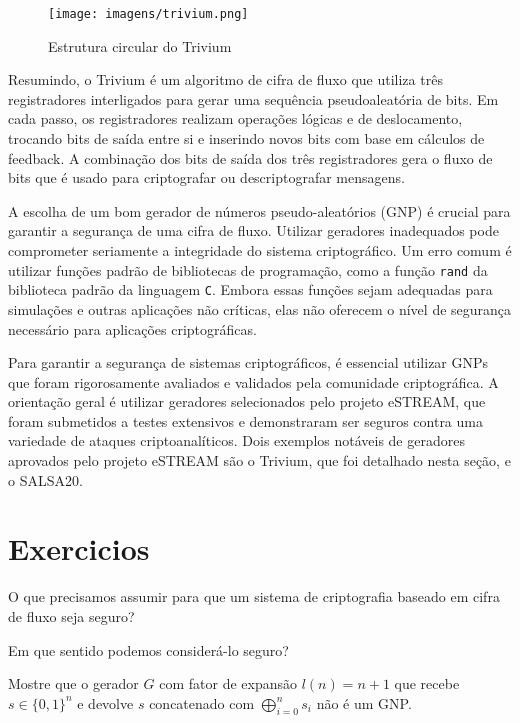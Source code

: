 \begin{figure}
  \centering
  \texttt{[image: imagens/trivium.png]}
  \caption{Estrutura circular do Trivium}
\end{figure}

Resumindo, o Trivium é um algoritmo de cifra de fluxo que utiliza três registradores interligados para gerar uma sequência pseudoaleatória de bits.
Em cada passo, os registradores realizam operações lógicas e de deslocamento, trocando bits de saída entre si e inserindo novos bits com base em cálculos de feedback.
A combinação dos bits de saída dos três registradores gera o fluxo de bits que é usado para criptografar ou descriptografar mensagens.

A escolha de um bom gerador de números pseudo-aleatórios (GNP) é crucial para garantir a segurança de uma cifra de fluxo.
Utilizar geradores inadequados pode comprometer seriamente a integridade do sistema criptográfico. Um erro comum é utilizar funções padrão de bibliotecas de programação, como a função \texttt{rand} da biblioteca padrão da linguagem \texttt{C}.
Embora essas funções sejam adequadas para simulações e outras aplicações não críticas, elas não oferecem o nível de segurança necessário para aplicações criptográficas.

Para garantir a segurança de sistemas criptográficos, é essencial utilizar GNPs que foram rigorosamente avaliados e validados pela comunidade criptográfica.
A orientação geral é utilizar geradores selecionados pelo projeto eSTREAM, que foram submetidos a testes extensivos e demonstraram ser seguros contra uma variedade de ataques criptoanalíticos.
Dois exemplos notáveis de geradores aprovados pelo projeto eSTREAM são o Trivium, que foi detalhado nesta seção, e o SALSA20.


\section{Exercicios}
\label{sec:exercicios}

\begin{exercicio}
  O que precisamos assumir para que um sistema de criptografia baseado em cifra de fluxo seja seguro?

  Em que sentido podemos considerá-lo seguro?
\end{exercicio}

\begin{exercicio}
Mostre que o gerador $G$ com fator de expansão $l(n) = n + 1$ que recebe $s \in \{0,1\}^n$ e devolve $s$ concatenado com $\bigoplus_{i=0}^ns_i$ não é um GNP.  
\end{exercicio}

